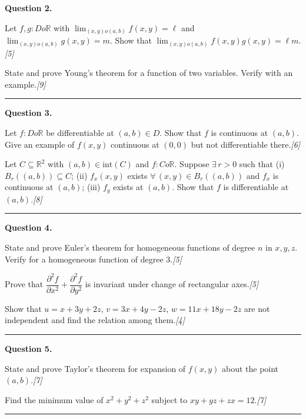\documentclass[11pt,a4paper]{article}
\newcommand{\pts}[1]{\hfill   \textit{[#1]}}
\begin{document}
\noindent   \textbf{Question 2.}

\begin{parts}
  \item Let $f,g:D o\mathbb{R}$ with $\lim_{(x,y) o(a,b)}f(x,y)=\ell$ and $\lim_{(x,y) o(a,b)}g(x,y)=m$. Show that $\lim_{(x,y) o(a,b)}f(x,y)g(x,y)=\ell m$.\pts{5}
  \item State and prove Young's theorem for a function of two variables. Verify with an example.\pts{9}
\end{parts}
\medskip\rule{\linewidth}{0.2pt}

\medskip


\noindent   \textbf{Question 3.}

\begin{parts}
  \item Let $f:D o\mathbb{R}$ be differentiable at $(a,b)\in D$. Show that $f$ is continuous at $(a,b)$. Give an example of $f(x,y)$ continuous at $(0,0)$ but not differentiable there.\pts{6}
  \item Let $C\subseteq\mathbb{R}^2$ with $(a,b)\in \text{int}(C)$ and $f:C o\mathbb{R}$. Suppose $\exists\, r>0$ such that (i) $B_r((a,b))\subseteq C$; (ii) $f_x(x,y)$ exists $\forall\,(x,y)\in B_r((a,b))$ and $f_x$ is continuous at $(a,b)$; (iii) $f_y$ exists at $(a,b)$. Show that $f$ is differentiable at $(a,b)$.\pts{8}
\end{parts}
\medskip\rule{\linewidth}{0.2pt}

\medskip


\noindent   \textbf{Question 4.}

\begin{parts}
  \item State and prove Euler's theorem for homogeneous functions of degree $n$ in $x,y,z$. Verify for a homogeneous function of degree 3.\pts{5}
  \item Prove that $\dfrac{\partial^2 f}{\partial x^2}+\dfrac{\partial^2 f}{\partial y^2}$ is invariant under change of rectangular axes.\pts{5}
  \item Show that $u=x+3y+2z$, $v=3x+4y-2z$, $w=11x+18y-2z$ are not independent and find the relation among them.\pts{4}
\end{parts}
\medskip\rule{\linewidth}{0.2pt}

\medskip


\noindent   \textbf{Question 5.}

\begin{parts}
  \item State and prove Taylor's theorem for expansion of $f(x,y)$ about the point $(a,b)$.\pts{7}
  \item Find the minimum value of $x^2+y^2+z^2$ subject to $xy+yz+zx=12$.\pts{7}
\end{parts}
\medskip\rule{\linewidth}{0.2pt}
\end{document}
